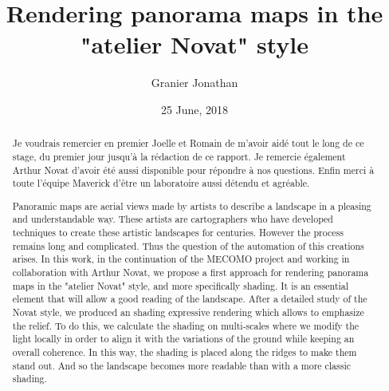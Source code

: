 \documentclass[12pt, a4paper]{memoir} %
\title{Rendering panorama maps in the "atelier Novat" style} %
\author{Granier Jonathan}
\date{25 June, 2018} %
\begin{document}
\frontmatter
\maketitle

\clearpage

\setlength{\parskip}{-1pt plus 1pt}

\renewcommand{\abstracttextfont}{\normalfont}


~\\~\\~\\~\\~\\~\\~\\~\\~\\
\renewcommand\abstractname{Remerciements}
\begin{abstract}
Je voudrais remercier en premier Joelle et Romain de m'avoir aidé tout le long de ce stage, du premier jour jusqu'à la rédaction de ce rapport. Je remercie également Arthur Novat d'avoir été aussi disponible pour répondre à nos questions. Enfin merci à toute l’équipe Maverick d'être un laboratoire aussi détendu et agréable.
\end{abstract}

\clearpage

\renewcommand{\abstracttextfont}{\normalfont}
\begin{abstract} 
Panoramic maps are aerial views made by artists to describe a landscape in a pleasing and understandable way. These artists are cartographers who have developed techniques to create these artistic landscapes for centuries. However the process remains long and complicated. Thus the question of the automation of this creations arises. In this work, in the continuation of the MECOMO project and working in collaboration with Arthur Novat, we propose a first approach for rendering panorama maps in the "atelier Novat" style, and more specifically shading. It is an essential element that will allow a good reading of the landscape. After a detailed study of the Novat style, we produced an shading expressive rendering which allows to emphasize the relief. To do this, we calculate the shading on multi-scales where we modify the light locally in order to align it with the variations of the ground while keeping an overall coherence. In this way, the shading is placed along the ridges to make them stand out. And so the landscape becomes more readable than with a more classic shading.
\end{abstract}
\end{document}

